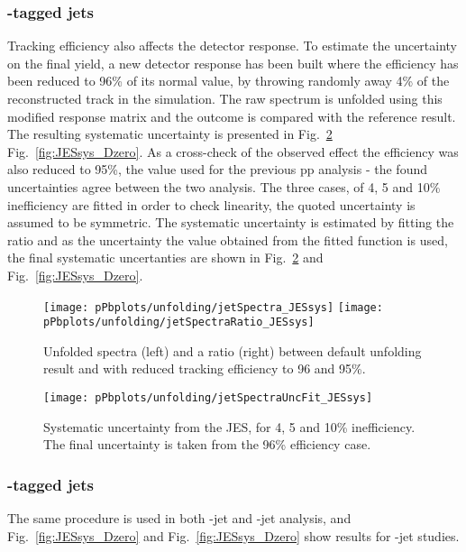 \subsubsection{\Dstar-tagged jets}

Tracking efficiency also affects the detector response. To estimate the uncertainty on the final yield, a new detector response has been built where the efficiency has been reduced to 96\% of its normal value, by throwing randomly away 4\% of the reconstructed track in the simulation.
The raw spectrum is unfolded using this modified response matrix and the outcome is compared with the reference result. The resulting systematic uncertainty is presented in Fig.~\ref{fig:JESsys} Fig.~\ref{fig:JESsys_Dzero}. As a cross-check of the observed effect the efficiency was also reduced to 95\%, the value used for the previous pp analysis - the found uncertainties agree between the two analysis. 
The three cases, of 4, 5 and 10\% inefficiency are fitted in order to check linearity, the quoted uncertainty is assumed to be symmetric. 
The systematic uncertainty is estimated by fitting the ratio and as the uncertainty the value obtained from the fitted function is used, the final systematic uncertanties are shown in Fig.~\ref{fig:JESsys} and Fig.~\ref{fig:JESsys_Dzero}.


\begin{figure}[bth]
\centering
\texttt{[image: pPbplots/unfolding/jetSpectra\_JESsys]}
\texttt{[image: pPbplots/unfolding/jetSpectraRatio\_JESsys]}
\caption{Unfolded spectra (left) and a ratio (right) between default unfolding result and with reduced tracking efficiency to 96 and 95\%.}
\label{fig:JESsys}
\end{figure}


\begin{figure}[bth]
\centering
\texttt{[image: pPbplots/unfolding/jetSpectraUncFit\_JESsys]}
\caption{Systematic uncertainty from the JES, for 4, 5 and 10\% inefficiency. The final uncertainty is taken from the 96\% efficiency case. }
\label{fig:JESsys}
\end{figure}

\subsubsection{\Dzero-tagged jets}

The same procedure is used in both \Dstar-jet and \Dzero-jet analysis, and Fig.~\ref{fig:JESsys_Dzero} and Fig.~\ref{fig:JESsys_Dzero} show results for \Dzero-jet studies.

